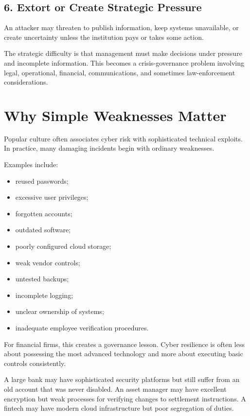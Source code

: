 \subsection{6. Extort or Create Strategic Pressure}

An attacker may threaten to publish information, keep systems unavailable, or create uncertainty unless the institution pays or takes some action.

The strategic difficulty is that management must make decisions under pressure and incomplete information. This becomes a crisis-governance problem involving legal, operational, financial, communications, and sometimes law-enforcement considerations.

\section{Why Simple Weaknesses Matter}

Popular culture often associates cyber risk with sophisticated technical exploits. In practice, many damaging incidents begin with ordinary weaknesses.

Examples include:

\begin{itemize}
    \item reused passwords;
    \item excessive user privileges;
    \item forgotten accounts;
    \item outdated software;
    \item poorly configured cloud storage;
    \item weak vendor controls;
    \item untested backups;
    \item incomplete logging;
    \item unclear ownership of systems;
    \item inadequate employee verification procedures.
\end{itemize}

For financial firms, this creates a governance lesson. Cyber resilience is often less about possessing the most advanced technology and more about executing basic controls consistently.

A large bank may have sophisticated security platforms but still suffer from an old account that was never disabled. An asset manager may have excellent encryption but weak processes for verifying changes to settlement instructions. A fintech may have modern cloud infrastructure but poor segregation of duties.

